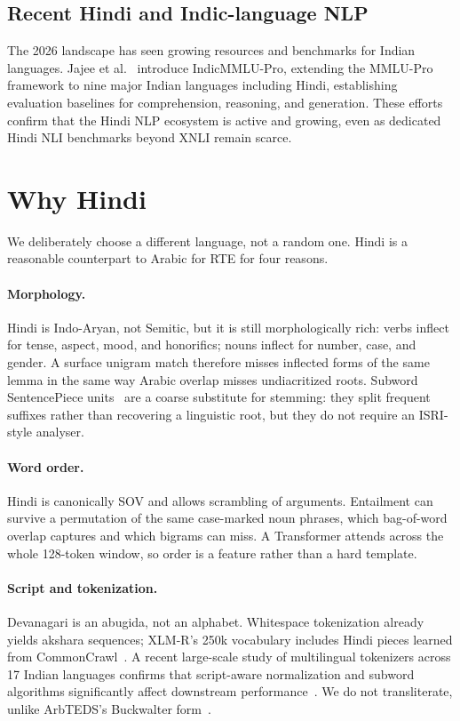 \documentclass[conference]{IEEEtran}
\begin{document}
\subsection{Recent Hindi and Indic-language NLP}
The 2026 landscape has seen growing resources and benchmarks for Indian languages. Jajee et al.~\citep{jajee2026indicmmlu} introduce IndicMMLU-Pro, extending the MMLU-Pro framework to nine major Indian languages including Hindi, establishing evaluation baselines for comprehension, reasoning, and generation. These efforts confirm that the Hindi NLP ecosystem is active and growing, even as dedicated Hindi NLI benchmarks beyond XNLI remain scarce.

\section{Why Hindi}
\label{sec:hindi}

We deliberately choose a different language, not a random one. Hindi is a reasonable counterpart to Arabic for RTE for four reasons.

\paragraph{Morphology.}
Hindi is Indo-Aryan, not Semitic, but it is still morphologically rich: verbs inflect for tense, aspect, mood, and honorifics; nouns inflect for number, case, and gender. A surface unigram match therefore misses inflected forms of the same lemma in the same way Arabic overlap misses undiacritized roots. Subword SentencePiece units~\citep{kudo2018sentencepiece} are a coarse substitute for stemming: they split frequent suffixes rather than recovering a linguistic root, but they do not require an ISRI-style analyser.

\paragraph{Word order.}
Hindi is canonically SOV and allows scrambling of arguments. Entailment can survive a permutation of the same case-marked noun phrases, which bag-of-word overlap captures and which bigrams can miss. A Transformer attends across the whole 128-token window, so order is a feature rather than a hard template.

\paragraph{Script and tokenization.}
Devanagari is an abugida, not an alphabet. Whitespace tokenization already yields akshara sequences; XLM-R's 250k vocabulary includes Hindi pieces learned from CommonCrawl~\citep{conneau2020xlmr}. A recent large-scale study of multilingual tokenizers across 17 Indian languages confirms that script-aware normalization and subword algorithms significantly affect downstream performance~\citep{brahma2026tokenization}. We do not transliterate, unlike ArbTEDS's Buckwalter form~\citep{alabbas2013dataset}.
\end{document}

